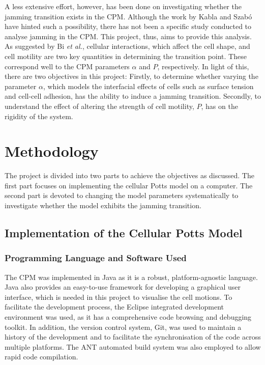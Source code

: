 \documentclass[a4paper,12pt]{article}
\begin{document}
A less extensive effort, however, has been done on investigating whether the jamming transition exists in the CPM. Although the work by Kabla \cite{kabla2012} and Szab\'o \cite{szabo2010} have hinted such a possibility, there has not been a specific study conducted to analyse jamming in the CPM.  This project, thus, aims to provide this analysis. As suggested by Bi \emph{et al.}, cellular interactions, which affect the cell shape, and cell motility are two key quantities in determining the transition point. These correspond well to the CPM parameters $\alpha$ and $P$, respectively. In light of this, there are two objectives in this project: Firstly, to determine whether varying the parameter $\alpha$, which models the interfacial effects of cells such as surface tension and cell-cell adhesion, has the ability to induce a jamming transition. Secondly, to understand the effect of altering the strength of cell motility, $P$, has on the rigidity of the system.


\section{Methodology}
The project is divided into two parts to achieve the objectives as discussed. The first part focuses on implementing the cellular Potts model on a computer. The second part is devoted to changing the model parameters systematically to investigate whether the model exhibits the jamming transition.

\subsection{Implementation of the Cellular Potts Model}
\subsubsection{Programming Language and Software Used}
The CPM was implemented in Java as it is a robust, platform-agnostic language. Java also provides an easy-to-use framework for developing a graphical user interface, which is needed in this project to visualise the cell motions. To facilitate the development process, the Eclipse integrated development environment was used, as it has a comprehensive code browsing and debugging toolkit. In addition, the version control system, Git, was used to maintain a history of the development and to facilitate the synchronisation of the code across multiple platforms. The ANT automated build system was also employed to allow rapid code compilation.
\end{document}
